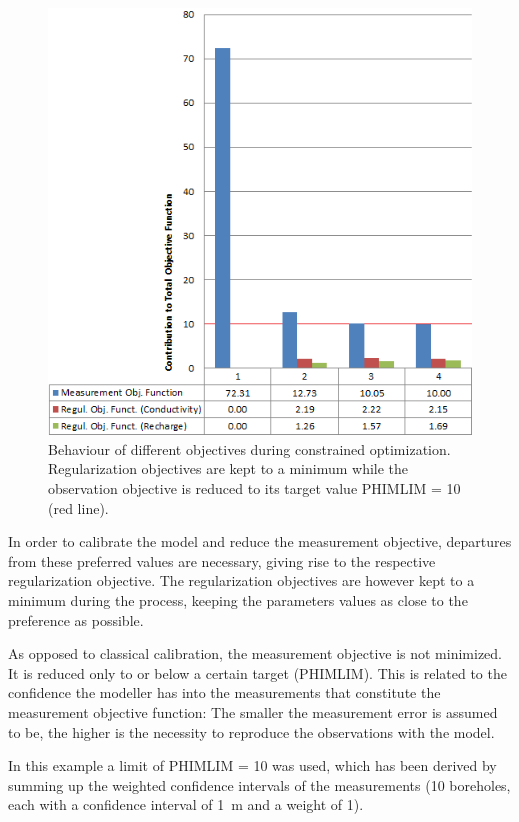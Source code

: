 \begin{figure}
	\center
	\includegraphics[width=\columnwidth]{figures/exampleConstraintOptimization.png}
\caption{Behaviour of different objectives during constrained optimization. Regularization objectives are kept to a minimum while the observation objective is reduced to its target value PHIMLIM = 10 (red line).}
\label{fig:fepest:exampleConstraintOptimization}
\end{figure}

In order to calibrate the model and reduce the measurement objective, departures from these preferred values are necessary, giving rise to the respective regularization objective. The regularization objectives are however kept to a minimum during the process, keeping the parameters values as close to the preference as possible.

As opposed to classical calibration, the measurement objective is  not minimized. It is reduced only to or below a certain target (PHIMLIM). This  is related to the confidence the modeller has into the measurements that constitute the measurement objective function: The smaller the measurement error is assumed to be, the higher is the necessity to reproduce the observations with the model. 

In this example a limit of PHIMLIM = 10 was used, which has been derived by summing up the weighted confidence intervals of the measurements (10 boreholes, each with a confidence interval of 1~m and a weight of 1).


